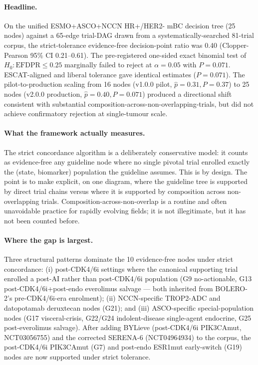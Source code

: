 
\paragraph{Headline.}
On the unified ESMO+ASCO+NCCN HR+/HER2- mBC decision tree (25 nodes) against a 65-edge trial-DAG drawn from a systematically-searched 81-trial corpus, the strict-tolerance evidence-free decision-point ratio was 0.40 (Clopper-Pearson 95\% CI 0.21--0.61). The pre-registered one-sided exact binomial test of $H_0: \mathrm{EFDPR} \le 0.25$ marginally failed to reject at $\alpha = 0.05$ with $P = 0.071$. ESCAT-aligned and liberal tolerance gave identical estimates ($P = 0.071$). The pilot-to-production scaling from 16 nodes (v1.0.0 pilot, $\hat p = 0.31, P = 0.37$) to 25 nodes (v2.0.0 production, $\hat p = 0.40, P = 0.071$) produced a directional shift consistent with substantial composition-across-non-overlapping-trials, but did not achieve confirmatory rejection at single-tumour scale.

\paragraph{What the framework actually measures.}
The strict concordance algorithm is a deliberately conservative model: it counts as evidence-free any guideline node where no single pivotal trial enrolled exactly the (state, biomarker) population the guideline assumes. This is by design. The point is to make explicit, on one diagram, where the guideline tree is supported by direct trial chains versus where it is supported by composition across non-overlapping trials. Composition-across-non-overlap is a routine and often unavoidable practice for rapidly evolving fields; it is not illegitimate, but it has not been counted before.

\paragraph{Where the gap is largest.}
Three structural patterns dominate the 10 evidence-free nodes under strict concordance: (i) post-CDK4/6i settings where the canonical supporting trial enrolled a post-AI rather than post-CDK4/6i population (G9 no-actionable, G13 post-CDK4/6i+post-endo everolimus salvage --- both inherited from BOLERO-2's pre-CDK4/6i-era enrolment); (ii) NCCN-specific TROP2-ADC and datopotamab deruxtecan nodes (G21); and (iii) ASCO-specific special-population nodes (G17 visceral-crisis, G22/G24 indolent-disease single-agent endocrine, G25 post-everolimus salvage). After adding BYLieve (post-CDK4/6i PIK3CAmut, NCT03056755) and the corrected SERENA-6 (NCT04964934) to the corpus, the post-CDK4/6i PIK3CAmut (G7) and post-endo ESR1mut early-switch (G19) nodes are now supported under strict tolerance.

